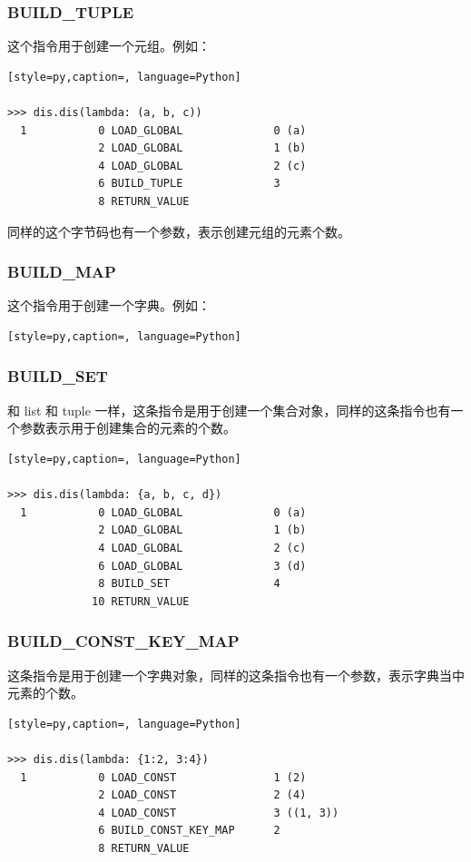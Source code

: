 \subsubsection{BUILD\_TUPLE}
这个指令用于创建一个元组。例如：
\begin{lstlisting}[style=py,caption=, language=Python]

>>> dis.dis(lambda: (a, b, c))
  1           0 LOAD_GLOBAL              0 (a)
              2 LOAD_GLOBAL              1 (b)
              4 LOAD_GLOBAL              2 (c)
              6 BUILD_TUPLE              3
              8 RETURN_VALUE
\end{lstlisting}
同样的这个字节码也有一个参数，表示创建元组的元素个数。
\subsubsection{BUILD\_MAP}
这个指令用于创建一个字典。例如：
\begin{lstlisting}[style=py,caption=, language=Python]

\end{lstlisting}
\subsubsection{BUILD\_SET}
和 list 和 tuple 一样，这条指令是用于创建一个集合对象，同样的这条指令也有一个参数表示用于创建集合的元素的个数。
\begin{lstlisting}[style=py,caption=, language=Python]

>>> dis.dis(lambda: {a, b, c, d})
  1           0 LOAD_GLOBAL              0 (a)
              2 LOAD_GLOBAL              1 (b)
              4 LOAD_GLOBAL              2 (c)
              6 LOAD_GLOBAL              3 (d)
              8 BUILD_SET                4
             10 RETURN_VALUE
\end{lstlisting}
\subsubsection{BUILD\_CONST\_KEY\_MAP}
这条指令是用于创建一个字典对象，同样的这条指令也有一个参数，表示字典当中元素的个数。
\begin{lstlisting}[style=py,caption=, language=Python]

>>> dis.dis(lambda: {1:2, 3:4})
  1           0 LOAD_CONST               1 (2)
              2 LOAD_CONST               2 (4)
              4 LOAD_CONST               3 ((1, 3))
              6 BUILD_CONST_KEY_MAP      2
              8 RETURN_VALUE
\end{lstlisting}
